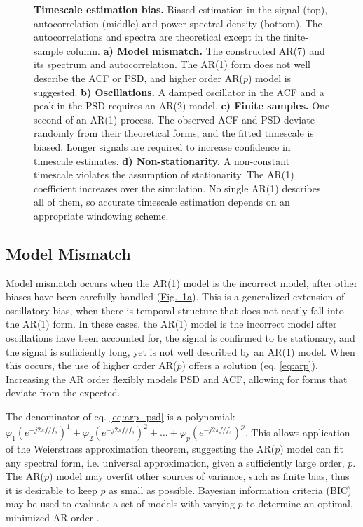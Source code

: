 \documentclass[pdflatex,lineno,sn-nature]{sn-jnl}
\newcommand{\figpanel}[3][]{\hyperref[#2]{Fig.~#1\ref*{#2}#3}}
\theoremstyle{thmstyleone}
\theoremstyle{thmstyletwo}
\theoremstyle{thmstylethree}
\begin{document}
\begin{figure}[htbp]
  \centering
  
  \caption{\textbf{Timescale estimation bias.} Biased estimation in the signal (top), autocorrelation (middle) and power spectral density (bottom). The autocorrelations and spectra are theoretical except in the finite-sample column. \textbf{a) Model mismatch.} The constructed AR(7) and its spectrum and autocorrelation. The AR(1) form does not well describe the ACF or PSD, and higher order AR($p$) model is suggested. \textbf{b) Oscillations.} A damped oscillator in the ACF and a peak in the PSD requires an AR(2) model. \textbf{c) Finite samples.} One second of an AR(1) process. The observed ACF and PSD deviate randomly from their theoretical forms, and the fitted timescale is biased. Longer signals are required to increase confidence in timescale estimates. \textbf{d) Non-stationarity.} A non-constant timescale violates the assumption of stationarity. The AR(1) coefficient increases over the simulation.  No single AR(1) describes all of them, so accurate timescale estimation depends on an appropriate windowing scheme.}
  \label{fig:bias}
\end{figure}

\subsection{Model Mismatch}

Model mismatch occurs when the AR(1) model is the incorrect model, after other biases have been carefully handled (\figpanel{fig:bias}{a}). This is a generalized extension of oscillatory bias, when there is temporal structure that does not neatly fall into the AR(1) form. In these cases, the AR(1) model is the incorrect model after oscillations have been accounted for, the signal is confirmed to be stationary, and the signal is sufficiently long, yet is not well described by an AR(1) model. When this occurs, the use of higher order AR($p$) offers a solution (eq. \ref{eq:arp}). Increasing the AR order flexibly models PSD and ACF, allowing for forms that deviate from the expected.

The denominator of eq. \ref{eq:arp_psd} is a polynomial: $\varphi_1 (e^{-j 2 \pi f / f_s})^1 + \varphi_2 (e^{-j 2 \pi f / f_s})^2 + \dots + \varphi_p (e^{-j 2 \pi f / f_s})^p$. This allows application of the Weierstrass approximation theorem, suggesting the AR($p$) model can fit any spectral form, i.e. universal approximation, given a sufficiently large order, $p$. The AR($p$) model may overfit other sources of variance, such as finite bias, thus it is desirable to keep $p$ as small as possible. Bayesian information criteria (BIC) may be used to evaluate a set of models with varying $p$ to determine an optimal, minimized AR order \cite{schwarz_estimating_1978, vidaurre_survey_2013}.
\end{document}
